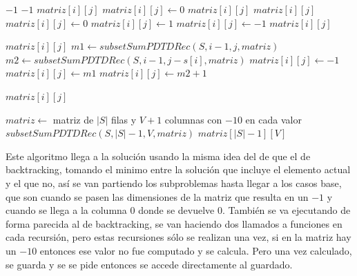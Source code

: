 \documentclass[a4paper]{article}
\begin{document}
\begin{algorithm}
\begin{algorithmic}
	 
			\State \Return $-1$
		\EndIf
			\State \Return $-1$
		\EndIf
				\State \Return $matriz[i][j]$
			\Else
				\State $matriz[i][j] \gets 0$
				\State \Return $matriz[i][j]$
			\EndIf
		\EndIf
				\State \Return $matriz[i][j]$
			\Else
					\State $matriz[i][j] \gets 0$			
				\Else
						\State $matriz[i][j] \gets 1$
					\Else
						\State $matriz[i][j] \gets -1$
					\EndIf
				\EndIf
				\State \Return $matriz[i][j]$
			\EndIf
		\EndIf
		
			\State \Return $matriz[i][j]$
		\Else
			\State $m1 \gets subsetSumPDTDRec(S, i-1, j, matriz)$ 
			\State $m2 \gets subsetSumPDTDRec(S, i-1, j - s[i], matriz)$ 
				\State $matriz[i][j] \gets -1$
			\Else
					\State $matriz[i][j] \gets m1$
				\Else
					\State $matriz[i][j] \gets m2 + 1$ 
				\EndIf
			\EndIf
			
			\State \Return $matriz[i][j]$
		\EndIf
	\EndProcedure
\end{algorithmic}
\end{algorithm}

\begin{algorithm}
\begin{algorithmic}
		\State $matriz \gets$ matriz de $|S|$ filas y $V+1$ columnas con $-10$ en cada valor 
		\State $subsetSumPDTDRec(S, |S|-1, V, matriz)$ 
		\State \Return $matriz[|S|-1][V]$
	\EndProcedure
\end{algorithmic}
\end{algorithm}

\pagebreak

Este algoritmo llega a la solución usando la misma idea del de que el de backtracking, tomando el minimo entre la solución que incluye el elemento actual y el que no, así se van partiendo los subproblemas hasta llegar a los casos base, que son cuando se pasen las dimensiones de la matriz que resulta en un $-1$ y cuando se llega a la columna $0$ donde se devuelve 0.
También se va ejecutando de forma parecida al de backtracking, se van haciendo dos llamados a funciones en cada recursión, pero estas recursiones sólo se realizan una vez, si en la matriz hay un $-10$ entonces ese valor no fue computado y se calcula. Pero una vez calculado, se guarda y se se pide entonces se accede directamente al guardado. 
\end{document}
